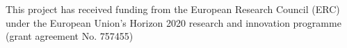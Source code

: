 \documentclass[sigconf]{aamas}
\begin{document}


\begin{acks}
This project has received funding from the European Research Council (ERC) under the European Union’s Horizon 2020 research and innovation programme (grant agreement No. 757455)
\end{acks}



 


\end{document}
